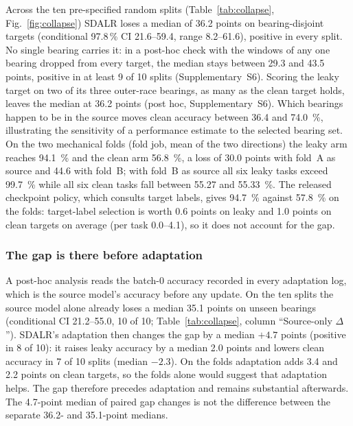 

Across the ten pre-specified random splits (Table~\ref{tab:collapse}, Fig.~\ref{fig:collapse}) SDALR loses a median of 36.2
points on bearing-disjoint targets (conditional 97.8\,\% CI 21.6--59.4, range 8.2--61.6), positive in every split. No single bearing carries it: in a post-hoc check with the windows of any one bearing dropped from every target, the median stays between 29.3 and 43.5 points, positive in at least 9 of 10 splits (Supplementary~S6). Scoring the leaky target on two of its three outer-race bearings, as many as the clean target holds, leaves the median at 36.2 points (post hoc, Supplementary~S6). Which bearings happen to be in the source moves clean accuracy between \SI{36.4}{} and
\SI{74.0}{\percent}, illustrating the sensitivity of a performance estimate to the selected bearing set. On
the two mechanical folds (fold job, mean of the two directions) the leaky arm reaches \SI{94.1}{\percent} and the clean arm
\SI{56.8}{\percent}, a loss of 30.0
points with fold~A as source and 44.6 with fold~B; with fold~B as source all six leaky tasks exceed \SI{99.7}{\percent} while
all six clean tasks fall between \SI{55.27}{} and \SI{55.33}{\percent}. The released checkpoint policy, which consults target
labels, gives \SI{94.7}{\percent} against \SI{57.8}{\percent} on the folds: target-label selection is worth 0.6 points on leaky
and 1.0 points on clean targets on average (per task 0.0--4.1), so it does not account for the gap.

\subsubsection{The gap is there before adaptation}

A post-hoc analysis reads the batch-0 accuracy recorded in every adaptation
log, which is the source model's accuracy before any update. On the ten splits the source model alone already loses a median 35.1 points on unseen bearings
(conditional CI 21.2--55.0, 10 of 10; Table~\ref{tab:collapse}, column ``Source-only $\Delta$''). SDALR's adaptation then changes the gap
by a median $+4.7$ points (positive in 8 of 10): it raises leaky accuracy by a median 2.0 points and
lowers clean accuracy in 7 of 10 splits (median $-2.3$). On the folds adaptation adds 3.4 and 2.2 points on clean targets,
so the folds alone would suggest that adaptation helps. The gap therefore precedes adaptation and remains substantial afterwards. The 4.7-point median of paired gap changes is not the difference between the separate 36.2- and 35.1-point medians.

